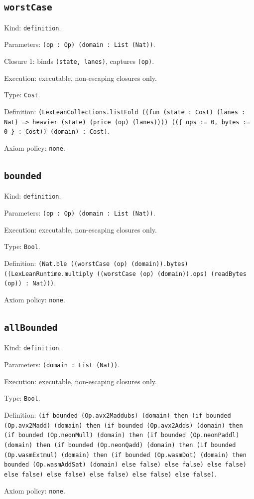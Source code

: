\documentclass[11pt]{article}
\begin{document}
\subsection*{\texttt{worstCase}}
\noindent Kind: \texttt{definition}.\par
\noindent Parameters: \texttt{(op : Op) (domain : List (Nat))}.\par
\noindent Closure 1: binds \texttt{(state, lanes)}, captures \texttt{(op)}.\par
\noindent Execution: executable, non-escaping closures only.\par
\noindent Type: \texttt{Cost}.\par
\noindent Definition: \texttt{(LexLeanCollections.listFold ((fun (state : Cost) (lanes : Nat) => heavier (state) (price (op) (lanes)))) ((\{ ops := 0, bytes := 0 \} : Cost)) (domain) : Cost)}.\par
\noindent Axiom policy: \texttt{none}.\par
\subsection*{\texttt{bounded}}
\noindent Kind: \texttt{definition}.\par
\noindent Parameters: \texttt{(op : Op) (domain : List (Nat))}.\par
\noindent Execution: executable, non-escaping closures only.\par
\noindent Type: \texttt{Bool}.\par
\noindent Definition: \texttt{(Nat.ble ((worstCase (op) (domain)).bytes) ((LexLeanRuntime.multiply ((worstCase (op) (domain)).ops) (readBytes (op)) : Nat)))}.\par
\noindent Axiom policy: \texttt{none}.\par
\subsection*{\texttt{allBounded}}
\noindent Kind: \texttt{definition}.\par
\noindent Parameters: \texttt{(domain : List (Nat))}.\par
\noindent Execution: executable, non-escaping closures only.\par
\noindent Type: \texttt{Bool}.\par
\noindent Definition: \texttt{(if bounded (Op.avx2Maddubs) (domain) then (if bounded (Op.avx2Madd) (domain) then (if bounded (Op.avx2Adds) (domain) then (if bounded (Op.neonMull) (domain) then (if bounded (Op.neonPaddl) (domain) then (if bounded (Op.neonQadd) (domain) then (if bounded (Op.wasmExtmul) (domain) then (if bounded (Op.wasmDot) (domain) then bounded (Op.wasmAddSat) (domain) else false) else false) else false) else false) else false) else false) else false) else false)}.\par
\noindent Axiom policy: \texttt{none}.\par
\end{document}
